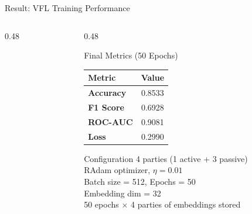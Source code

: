 \documentclass[aspectratio=169, 11pt]{beamer}
\begin{document}
\begin{frame}{Result: VFL Training Performance}
\begin{columns}[T]
\begin{column}{0.48\textwidth}
\begin{center}
      \end{center}
    \end{column}
    \begin{column}{0.48\textwidth}
      \begin{block}{Final Metrics (50 Epochs)}
        \centering
        \renewcommand{\arraystretch}{1.4}
        \begin{tabular}{>{\bfseries\footnotesize}l >{\footnotesize}c}
          \toprule
          \textbf{Metric} & \textbf{Value} \\
          \midrule
          Accuracy & 0.8533 \\
          F1 Score & 0.6928 \\
          ROC-AUC  & 0.9081 \\
          Loss     & 0.2990 \\
          \bottomrule
        \end{tabular}
      \end{block}
      \vspace{0.3cm}
      \begin{exampleblock}{Configuration}
        \footnotesize
        4 parties (1 active + 3 passive)\\
        RAdam optimizer, $\eta = 0.01$\\
        Batch size = 512, Epochs = 50\\
        Embedding dim = 32\\
        50 epochs $\times$ 4 parties of embeddings stored
      \end{exampleblock}
    \end{column}
  \end{columns}
\end{frame}
\end{document}
